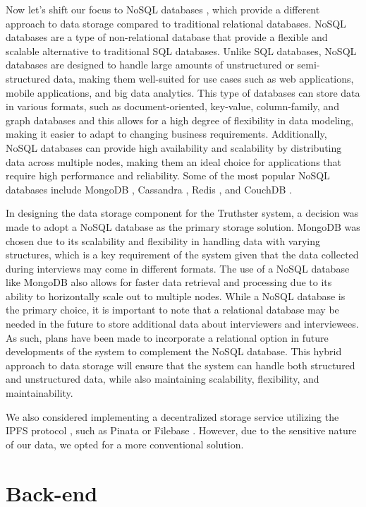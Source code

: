 \documentclass[target=mst,aauheader=]{thud}
\begin{document}
Now let's shift our focus to NoSQL databases \cite{noSQL}, which provide a different approach to data storage compared to traditional relational databases. NoSQL databases are a type of non-relational database that provide a flexible and scalable alternative to traditional SQL databases. Unlike SQL databases, NoSQL databases are designed to handle large amounts of unstructured or semi-structured data, making them well-suited for use cases such as web applications, mobile applications, and big data analytics. This type of databases can store data in various formats, such as document-oriented, key-value, column-family, and graph databases and this allows for a high degree of flexibility in data modeling, making it easier to adapt to changing business requirements. Additionally, NoSQL databases can provide high availability and scalability by distributing data across multiple nodes, making them an ideal choice for applications that require high performance and reliability. Some of the most popular NoSQL databases include MongoDB \cite{mongoDB}, Cassandra \cite{cassandra}, Redis \cite{redis}, and CouchDB \cite{apacheCouch}.

In designing the data storage component for the Truthster system, a decision was made to adopt a NoSQL database as the primary storage solution. MongoDB was chosen due to its scalability and flexibility in handling data with varying structures, which is a key requirement of the system given that the data collected during interviews may come in different formats. The use of a NoSQL database like MongoDB also allows for faster data retrieval and processing due to its ability to horizontally scale out to multiple nodes. While a NoSQL database is the primary choice, it is important to note that a relational database may be needed in the future to store additional data about interviewers and interviewees. As such, plans have been made to incorporate a relational option in future developments of the system to complement the NoSQL database. This hybrid approach to data storage will ensure that the system can handle both structured and unstructured data, while also maintaining scalability, flexibility, and maintainability.

We also considered implementing a decentralized storage service utilizing the IPFS protocol \cite{ipfs}, such as Pinata \cite{pinata} or Filebase \cite{filebase}. However, due to the sensitive nature of our data, we opted for a more conventional solution.

\section{Back-end}
\end{document}
